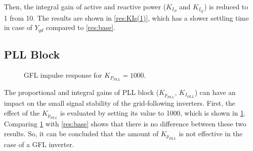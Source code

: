 Then, the integral gain of active and reactive power ($K_I_P$ and $K_I_Q$) is reduced to 1 from 10. The results are shown in 	\ref{res:KIs(1)}, which has a slower settling time in case of $Y_{qd}$ compared to \ref{res:base}. 

\subsection{\gls{PLL} Block}

\begin{figure}[ht]
\begin{center}
    \centering
   \nonindent
	\caption[GFL impulse response for $K_P_{PLL}=1000$]{GFL impulse response for $K_P_{PLL}=1000$.}
	\label{res:KPPLL(1000)}
	\end{center}
\end{figure}

The proportional and integral gains of \gls{PLL} block ($K_p_{PLL}$, $K_I_{PLL}$) can have an impact on the small signal stability of the grid-following inverters. First, the effect of the $K_p_{PLL}$ is evaluated by setting its value to 1000, which is shown in \ref{res:KPPLL(1000)}. Comparing \ref{res:KPPLL(1000)} with \ref{res:base} shows that there is no difference between these two results. So, it can be concluded that the amount of $K_p_{PLL}$ is not effective in the case of a GFL inverter.

